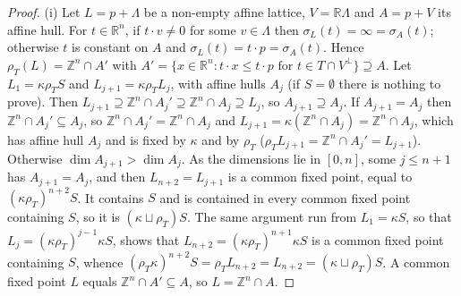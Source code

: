 \documentclass[11pt]{amsart}
\theoremstyle{definition}
\begin{document}
\begin{proof}
(i) Let $L=p+\Lambda$ be a non-empty affine lattice, $V=\mathbb R\Lambda$
and $A=p+V$ its affine hull. For $t\in\mathbb R^n$, if $t\cdot v\ne0$ for
some $v\in\Lambda$ then $\sigma_L(t)=\infty=\sigma_A(t)$; otherwise $t$
is constant on $A$ and $\sigma_L(t)=t\cdot p=\sigma_A(t)$. Hence
$\rho_T(L)=\mathbb Z^n\cap A'$ with $A'=\{x\in\mathbb R^n:t\cdot x\le
t\cdot p\text{ for }t\in T\cap V^\perp\}\supseteq A$. Let $L_1=\kappa
\rho_TS$ and $L_{j+1}=\kappa\rho_TL_j$, with affine hulls $A_j$ (if $S=
\emptyset$ there is nothing to prove). Then $L_{j+1}\supseteq\mathbb
Z^n\cap A_j'\supseteq\mathbb Z^n\cap A_j\supseteq L_j$, so $A_{j+1}
\supseteq A_j$. If $A_{j+1}=A_j$ then $\mathbb Z^n\cap A_j'\subseteq
A_j$, so $\mathbb Z^n\cap A_j'=\mathbb Z^n\cap A_j$ and $L_{j+1}=\kappa
(\mathbb Z^n\cap A_j)=\mathbb Z^n\cap A_j$, which has affine hull $A_j$
and is fixed by $\kappa$ and by $\rho_T$ ($\rho_TL_{j+1}=\mathbb Z^n\cap
A_j'=L_{j+1}$). Otherwise $\dim A_{j+1}>\dim A_j$. As the dimensions lie
in $[0,n]$, some $j\le n+1$ has $A_{j+1}=A_j$, and then $L_{n+2}=
L_{j+1}$ is a common fixed point, equal to $(\kappa\rho_T)^{n+2}S$. It
contains $S$ and is contained in every common fixed point containing
$S$, so it is $(\kappa\sqcup\rho_T)S$. The same argument run from $L_1=
\kappa S$, so that $L_j=(\kappa\rho_T)^{j-1}\kappa S$, shows that
$L_{n+2}=(\kappa\rho_T)^{n+1}\kappa S$ is a common fixed point
containing $S$, whence $(\rho_T\kappa)^{n+2}S=\rho_TL_{n+2}=L_{n+2}=
(\kappa\sqcup\rho_T)S$.
A common fixed point $L$ equals $\mathbb Z^n\cap A'\subseteq A$, so $L
=\mathbb Z^n\cap A$.


\end{proof}
\end{document}
